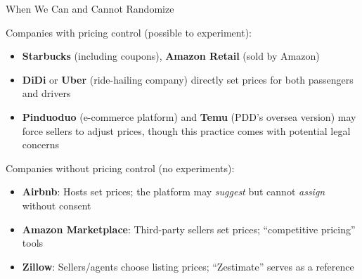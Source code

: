 \documentclass[aspectratio=169, 11pt]{beamer}
\begin{document}
\begin{frame}{When We Can and Cannot Randomize}

Companies with pricing control (possible to experiment):
\begin{itemize}
    \item \textbf{Starbucks} (including coupons), \textbf{Amazon Retail} (sold by Amazon)
    \item \textbf{DiDi} or \textbf{Uber} (ride-hailing company) directly set prices for both passengers and drivers
    \item \textbf{Pinduoduo} (e-commerce platform) and \textbf{Temu} (PDD's oversea version) may force sellers to adjust prices, though this practice comes with potential legal concerns
\end{itemize}

\medskip

Companies without pricing control (no experiments):
\begin{itemize}
    \item \textbf{Airbnb}: Hosts set prices; the platform may \emph{suggest} but cannot \emph{assign} without consent
    \item \textbf{Amazon Marketplace}: Third-party sellers set prices; ``competitive pricing'' tools
    \item \textbf{Zillow}: Sellers/agents choose listing prices; ``Zestimate'' serves as a reference
\end{itemize}

\end{frame}
\end{document}
